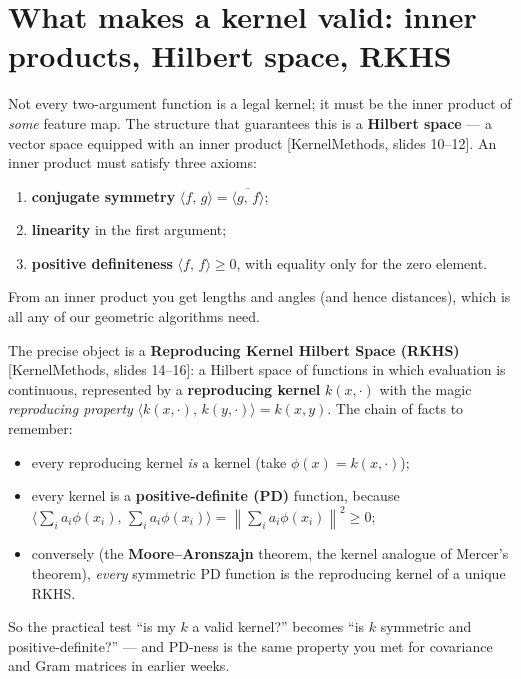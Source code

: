 \documentclass[11pt]{article}
\newcommand{\norm}[1]{\left\lVert #1 \right\rVert}
\newcommand{\inner}[2]{\langle #1,\,#2\rangle}
\newcommand{\deck}[1]{\textsf{\small[#1]}}
\begin{document}
\section{What makes a kernel valid: inner products, Hilbert space, RKHS}

Not every two-argument function is a legal kernel; it must be the inner product
of \emph{some} feature map. The structure that guarantees this is a
\textbf{Hilbert space} --- a vector space equipped with an inner product
\deck{KernelMethods, slides 10--12}. An inner product must satisfy three axioms:
\begin{enumerate}[nosep,leftmargin=*]
  \item \textbf{conjugate symmetry} $\inner{f}{g}=\overline{\inner{g}{f}}$;
  \item \textbf{linearity} in the first argument;
  \item \textbf{positive definiteness} $\inner{f}{f}\ge0$, with equality only for
  the zero element.
\end{enumerate}
From an inner product you get lengths and angles (and hence distances), which is
all any of our geometric algorithms need.

The precise object is a \textbf{Reproducing Kernel Hilbert Space (RKHS)}
\deck{KernelMethods, slides 14--16}: a Hilbert space of functions in which
evaluation is continuous, represented by a \textbf{reproducing kernel}
$k(x,\cdot)$ with the magic \emph{reproducing property} $\inner{k(x,\cdot)}{k(y,\cdot)}=k(x,y)$.
The chain of facts to remember:
\begin{itemize}[nosep,leftmargin=*]
  \item every reproducing kernel \emph{is} a kernel (take $\phi(x)=k(x,\cdot)$);
  \item every kernel is a \textbf{positive-definite (PD)} function, because
  $\inner{\sum_i a_i\phi(x_i)}{\sum_i a_i\phi(x_i)}=\norm{\sum_i a_i\phi(x_i)}^2\ge0$;
  \item conversely (the \textbf{Moore--Aronszajn} theorem, the kernel analogue of
  Mercer's theorem), \emph{every} symmetric PD function is the reproducing kernel
  of a unique RKHS.
\end{itemize}
So the practical test ``is my $k$ a valid kernel?'' becomes ``is $k$ symmetric and
positive-definite?'' --- and PD-ness is the same property you met for covariance
and Gram matrices in earlier weeks.
\end{document}
